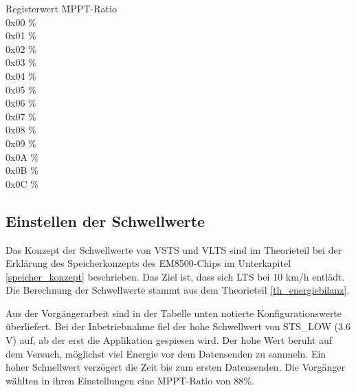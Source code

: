 \clearpage
\begin{minipage}{\textwidth}
    \begin{tabbing}
    Registerwert   \quad\= MPPT-Ratio    \\[0.8ex]
    0x00           \thinspace\% \\
    0x01           \thinspace\%\\
    0x02           \thinspace\%\\
    0x03           \thinspace\%\\
    0x04           \thinspace\%\\
    0x05           \thinspace\%\\
    0x06           \thinspace\% \\
    0x07           \thinspace\%\\
    0x08           \thinspace\%\\
    0x09           \thinspace\%\\
    0x0A           \thinspace\% \\
    0x0B           \thinspace\%\\
    0x0C           \thinspace\%\\
    \end{tabbing}
\end{minipage}


\subsection{Einstellen der Schwellwerte}
\label{v_schwellwerte}

Das Konzept der Schwellwerte von VSTS und VLTS sind im Theorieteil bei der Erklärung des Speicherkonzepts des EM8500-Chips im Unterkapitel \ref{speicher_konzept} beschrieben. Das Ziel ist, dass sich LTS bei 10 km/h entlädt. Die Berechnung der Schwellwerte stammt aus dem Theorieteil \ref{th_energiebilanz}.

Aus der Vorgängerarbeit sind in der Tabelle unten notierte Konfigurationswerte überliefert. Bei der Inbetriebnahme fiel der hohe Schwellwert von STS\_LOW (3.6 V) auf, ab der erst die Applikation gespiesen wird. Der hohe Wert beruht auf dem Versuch, möglichst viel Energie vor dem Datensenden zu sammeln. Ein hoher Schnellwert verzögert die Zeit bis zum ersten Datensenden. Die Vorgänger wählten in ihren Einstellungen eine MPPT-Ratio von 88\thinspace\%.

